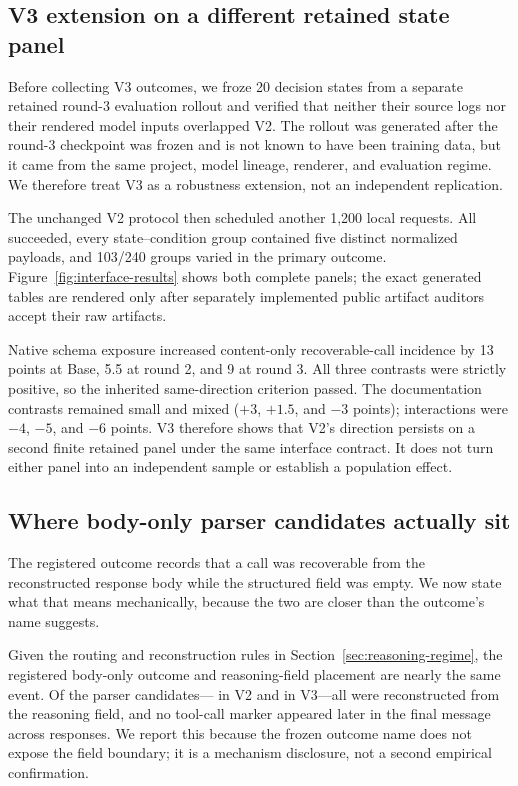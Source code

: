 \documentclass[10pt]{article}
\begin{document}
\subsection{V3 extension on a different retained state panel}

Before collecting V3 outcomes, we froze 20 decision states from a separate
retained round-3 evaluation rollout and verified that neither their source logs
nor their rendered model inputs overlapped V2. The rollout was generated after
the round-3 checkpoint was frozen and is not known to have been training data,
but it came from the same project, model lineage, renderer, and evaluation
regime. We therefore treat V3 as a robustness extension, not an independent
replication.

The unchanged V2 protocol then scheduled another 1,200 local requests. All
succeeded, every state--condition group contained five distinct normalized
payloads, and 103/240 groups varied in the primary outcome. Figure~\ref{fig:interface-results}
shows both complete panels; the exact generated tables are rendered only after
separately implemented public artifact auditors accept their raw artifacts.

Native schema exposure increased content-only recoverable-call incidence by
13 points at Base, 5.5 at round 2, and 9 at round 3. All three contrasts were
strictly positive, so the inherited same-direction criterion passed. The
documentation contrasts remained small and mixed ($+3$, $+1.5$, and $-3$
points); interactions were $-4$, $-5$, and $-6$ points. V3 therefore shows
that V2's direction persists on a second finite retained panel under the same
interface contract. It does not turn either panel into an independent sample
or establish a population effect.

\subsection{Where body-only parser candidates actually sit}
\label{sec:where-calls-sit}

The registered outcome records that a call was recoverable from the
reconstructed response body while the structured field was empty. We now state
what that means mechanically, because the two are closer than the outcome's
name suggests.

Given the routing and reconstruction rules in
Section~\ref{sec:reasoning-regime}, the registered body-only outcome and
reasoning-field placement are nearly the same event. Of the
\SpanRecoveredCalls{} parser candidates---\SpanVTwoRecovered{} in V2 and
\SpanVThreeRecovered{} in V3---all \SpanInsideReasoning{} were reconstructed
from the reasoning field, and no tool-call marker appeared later in the final
message across \SpanTotalRows{} responses. We report this because the frozen
outcome name does not expose the field boundary; it is a mechanism disclosure,
not a second empirical confirmation.
\end{document}
